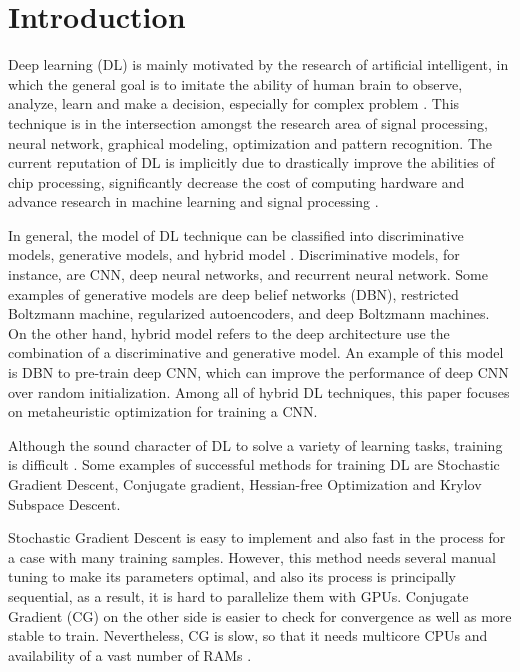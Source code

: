 \documentclass[10pt,letterpaper]{article}
\begin{document}
\section*{Introduction}
\label{Introduction}

Deep learning (DL) is mainly motivated by the research of artificial intelligent, in which the general goal is to imitate the ability of human brain to observe, analyze, learn and make a decision, especially for complex problem \cite{Naja}. This technique is in the intersection amongst the research area of signal processing, neural network, graphical modeling, optimization and pattern recognition. The current reputation of DL is implicitly due to drastically improve the abilities of chip processing, significantly decrease the cost of computing hardware and advance research in machine learning and signal processing \cite{Deng}.

In general, the model of DL technique can be classified into discriminative models, generative models, and hybrid model \cite{Deng}. Discriminative models, for instance, are CNN, deep neural networks, and recurrent neural network. Some examples of generative models are deep belief networks (DBN), restricted Boltzmann machine, regularized autoencoders, and deep Boltzmann machines. On the other hand, hybrid model refers to the deep architecture use the combination of a discriminative and generative model. An example of this model is DBN to pre-train deep CNN, which can improve the performance of deep CNN over random initialization. Among all of hybrid DL techniques, this paper focuses on metaheuristic optimization for training a CNN. 

Although the sound character of DL to solve a variety of learning tasks, training is difficult\cite{Lamos} \cite{Glauner} \cite{Rasdi}. Some examples of successful methods for training DL are Stochastic Gradient Descent, Conjugate gradient, Hessian-free Optimization and Krylov Subspace Descent.

Stochastic Gradient Descent is easy to implement and also fast in the process for a case with many training samples. However, this method needs several manual tuning to make its parameters optimal, and also its process is principally sequential, as a result, it is hard to parallelize them with GPUs. Conjugate Gradient (CG) on the other side is easier to check for convergence as well as more stable to train. Nevertheless, CG is slow, so that it needs multicore CPUs and availability of a vast number of RAMs \cite{QVLee}. 
\end{document}
